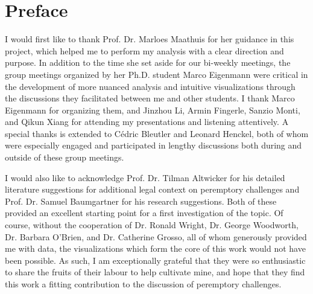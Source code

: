 \chapter*{Preface}

I would first like to thank Prof. Dr. Marloes Maathuis for her guidance in this project, which helped me to perform my analysis
with a clear direction and purpose. In addition to the time she set aside for our bi-weekly meetings, the group meetings organized
by her Ph.D. student Marco Eigenmann were critical in the development of more nuanced analysis and intuitive visualizations
through the discussions they facilitated between me and other students. I thank Marco Eigenmann for organizing them, and Jinzhou
Li, Armin Fingerle, Sanzio Monti, and Qikun Xiang for attending my presentations and listening attentively. A special thanks is
extended to C\'edric Bleutler and Leonard Henckel, both of whom were especially engaged and participated in lengthy discussions
both during and outside of these group meetings.

I would also like to acknowledge Prof. Dr. Tilman Altwicker for his detailed literature suggestions for additional legal context
on peremptory challenges and Prof. Dr. Samuel Baumgartner for his research suggestions. Both of these provided an excellent
starting point for a first investigation of the topic. Of course, without the cooperation of Dr. Ronald Wright, Dr. George
Woodworth, Dr. Barbara O'Brien, and Dr. Catherine Grosso, all of whom generously provided me with data, the visualizations which
form the core of this work would not have been possible. As such, I am exceptionally grateful that they were so enthusiastic to
share the fruits of their labour to help cultivate mine, and hope that they find this work a fitting contribution to the
discussion of peremptory challenges.

